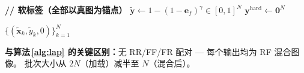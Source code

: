 \documentclass[12pt]{article}
\begin{document}
\begin{algorithm}[p]
\begin{algorithmic}[1]
\State \textbf{// 软标签（全部以真图为锚点）}
\State $\tilde{\mathbf{y}} \gets 1 - (1 - \mathbf{e}_f)^{\gamma} \in [0,1]^{N}$
\State $\mathbf{y}^{\text{hard}} \gets \mathbf{0}^{N}$ 

\State \Return $\{(\tilde{\mathbf{x}}_k, \tilde{y}_k, 0)\}_{k=1}^{N}$

\vspace{4pt}
\State \textbf{与算法\,\ref{alg:lap} 的关键区别：}无 RR/FF/FR 配对 — 每个输出均为 RF 混合图像。
\State 批次大小从 $2N$（加载）减半至 $N$（混合后）。
\end{algorithmic}
\end{algorithm}
\end{document}
